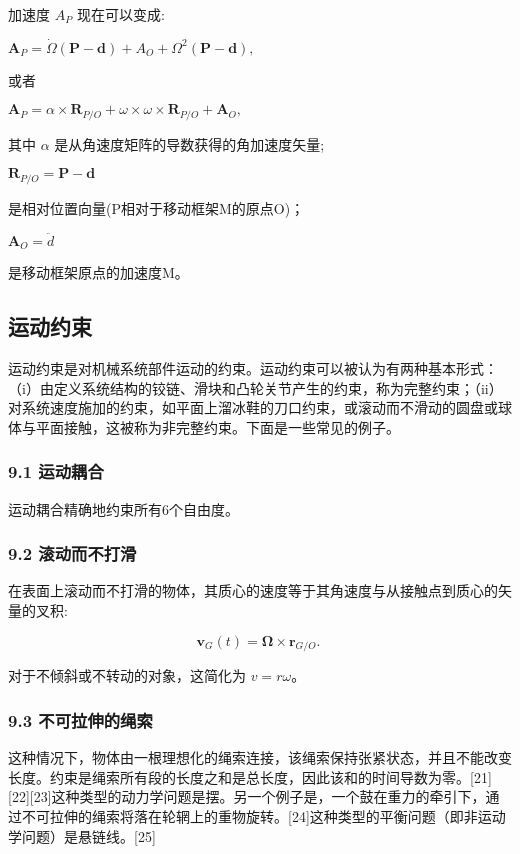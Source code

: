 加速度 $A_P$ 现在可以变成:

$\mathbf{A}_P = \dot{\Omega} (\mathbf{P - d}) + A_O + \Omega^2 (\mathbf{P - d}),$

或者

$\mathbf{A}_P = \alpha \times \mathbf{R}_{P/O} + \omega \times \omega \times \mathbf{R}_{P/O} + \mathbf{A}_O,$

其中 $\alpha$ 是从角速度矩阵的导数获得的角加速度矢量;

$\mathbf{R}_{P/O}=\mathbf{P}-\mathbf{d}$

是相对位置向量(P相对于移动框架M的原点O)；

$\mathbf{A}_{O}=\ddot{d}$

是移动框架原点的加速度M。

\subsection{运动约束}

运动约束是对机械系统部件运动的约束。运动约束可以被认为有两种基本形式：（i）由定义系统结构的铰链、滑块和凸轮关节产生的约束，称为完整约束；（ii）对系统速度施加的约束，如平面上溜冰鞋的刀口约束，或滚动而不滑动的圆盘或球体与平面接触，这被称为非完整约束。下面是一些常见的例子。

\subsubsection{9.1 运动耦合}

运动耦合精确地约束所有6个自由度。

\subsubsection{9.2 滚动而不打滑}

在表面上滚动而不打滑的物体，其质心的速度等于其角速度与从接触点到质心的矢量的叉积:

\begin{equation}
\mathbf{v}_G(t) = \mathbf{\Omega} \times \mathbf{r}_{G/O}.~
\end{equation}

对于不倾斜或不转动的对象，这简化为 $v = r\omega$。


\subsubsection{9.3 不可拉伸的绳索}

这种情况下，物体由一根理想化的绳索连接，该绳索保持张紧状态，并且不能改变长度。约束是绳索所有段的长度之和是总长度，因此该和的时间导数为零。[21][22][23]这种类型的动力学问题是摆。另一个例子是，一个鼓在重力的牵引下，通过不可拉伸的绳索将落在轮辋上的重物旋转。[24]这种类型的平衡问题（即非运动学问题）是悬链线。[25]

